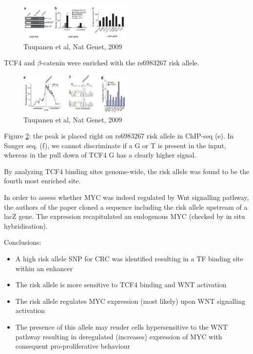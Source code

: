 \begin{figure}
\centering
\includegraphics[width=0.5\textwidth]{../_resources/Screenshot_2022-10-14_at_10-52-51.png}
\caption{Tuupanen et al, Nat Genet, 2009}
\label{fig:rs1}
\end{figure}

TCF4 and $\beta$-catenin were enriched with the rs6983267 risk allele.

\begin{figure}
\centering
\includegraphics[width=0.5\textwidth]{../_resources/Screenshot_2022-10-14_at_10-54-02.png}
\caption{Tuupanen et al, Nat Genet, 2009}
\label{fig:rs2}
\end{figure}

Figure \ref{fig:rs2}: the peak is placed right on rs6983267 risk allele in ChIP-seq (e). In Sanger seq. (f), we cannot discriminate if a G or T is present in the input, whereas in the pull down of TCF4 G has a clearly higher signal.

By analyzing TCF4 binding sites genome-wide, the risk allele was found to be the fourth most enriched site.

In order to assess whether MYC was indeed regulated by Wnt signalling pathway, the authors of the paper cloned a sequence including the risk allele upstream of a lacZ gene. The expression recapitulated an endogenous MYC (checked by in situ hybridisation).

Conclusions:

\begin{itemize}
\tightlist
\item
  A high risk allele SNP for CRC was identified resulting in a TF binding site within an enhancer
\item
  The risk allele is more sensitive to TCF4 binding and WNT activation
\item
  The risk allele regulates MYC expression (most likely) upon WNT signalling activation
\item
  The presence of this allele may render cells hypersensitive to the WNT pathway resulting in deregulated (increases) expression of MYC with consequent pro-proliferative behaviour
\end{itemize}

